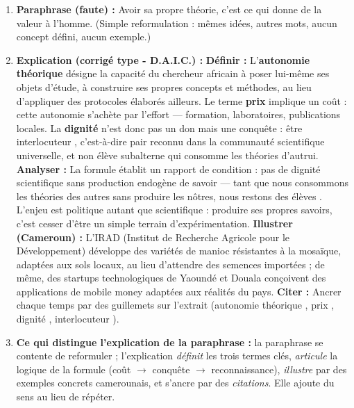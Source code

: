 \documentclass[11pt]{article}
\begin{document}
\begin{exoresolu}
\begin{enumerate}
\item \textbf{Paraphrase (faute) :} \og Avoir sa propre théorie, c'est ce qui donne de la valeur à l'homme. \fg (Simple reformulation : mêmes idées, autres mots, aucun concept défini, aucun exemple.)
\item \textbf{Explication (corrigé type - D.A.I.C.) :}
\textbf{Définir :} L'\textbf{autonomie théorique} désigne la capacité du chercheur africain à poser lui-même ses objets d'étude, à construire ses propres concepts et méthodes, au lieu d'appliquer des protocoles élaborés ailleurs. Le terme \textbf{prix} implique un coût : cette autonomie s'achète par l'effort — formation, laboratoires, publications locales. La \textbf{dignité} n'est donc pas un don mais une conquête : être \og interlocuteur \fg, c'est-à-dire pair reconnu dans la communauté scientifique universelle, et non \og élève \fg subalterne qui consomme les théories d'autrui.
\textbf{Analyser :} La formule établit un rapport de condition : pas de dignité scientifique sans production endogène de savoir — \og tant que nous consommons les théories des autres sans produire les nôtres, nous restons des élèves \fg. L'enjeu est politique autant que scientifique : produire ses propres savoirs, c'est cesser d'être un simple terrain d'expérimentation.
\textbf{Illustrer (Cameroun) :} L'IRAD (Institut de Recherche Agricole pour le Développement) développe des variétés de manioc résistantes à la mosaïque, adaptées aux sols locaux, au lieu d'attendre des semences importées ; de même, des startups technologiques de Yaoundé et Douala conçoivent des applications de mobile money adaptées aux réalités du pays.
\textbf{Citer :} Ancrer chaque temps par des guillemets sur l'extrait (\og autonomie théorique \fg, \og prix \fg, \og dignité \fg, \og interlocuteur \fg).
\item \textbf{Ce qui distingue l'explication de la paraphrase :} la paraphrase se contente de reformuler ; l'explication \emph{définit} les trois termes clés, \emph{articule} la logique de la formule (coût $\rightarrow$ conquête $\rightarrow$ reconnaissance), \emph{illustre} par des exemples concrets camerounais, et s'ancre par des \emph{citations}. Elle ajoute du sens au lieu de répéter.
\end{enumerate}
\end{exoresolu}
\end{document}

